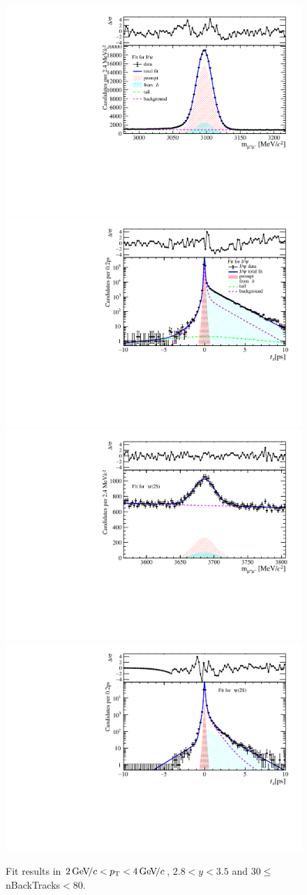 \begin{figure}[H]
\begin{center}
\includegraphics[width=0.47\linewidth]{pdf/Jpsi/drawmassB/n5y2pt2.pdf}
\includegraphics[width=0.47\linewidth]{pdf/Jpsi/2DFitB/n5y2pt2.pdf}
\vspace*{-0.5cm}
\includegraphics[width=0.47\linewidth]{pdf/Psi2S/drawmassB/n5y2pt2.pdf}
\includegraphics[width=0.47\linewidth]{pdf/Psi2S/2DFitB/n5y2pt2.pdf}
\vspace*{-0.5cm}
\end{center}
\caption{Fit results in $2\text{\,Ge\kern -0.1em V\!/}c<p_{\mathrm{T}}<4\text{\,Ge\kern -0.1em V\!/}c$, $2.8<y<3.5$ and 30$\leq$nBackTracks$<$80.}
\label{Fitn5y2pt2}
\end{figure}
